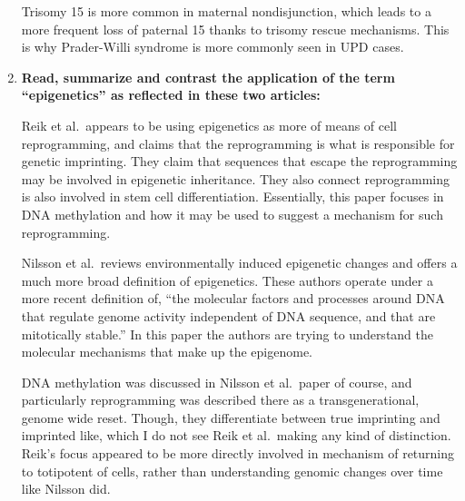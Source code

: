 \documentclass[plain,basic]{inVerba-notes}
\begin{document}
\begin{enumerate}
    Trisomy 15 is more common in maternal nondisjunction, which leads to a more frequent loss of paternal 15 thanks to trisomy rescue mechanisms. This is why Prader-Willi syndrome is more commonly seen in UPD cases. 
    
    \item \textbf{Read, summarize and contrast the application of the term “epigenetics” as reflected in these two articles:}
    

    Reik et al.\ appears to be using epigenetics as more of means of cell reprogramming, and claims that the reprogramming is what is responsible for genetic imprinting. They claim that sequences that escape the reprogramming may be involved in epigenetic inheritance. They also connect reprogramming is also involved in stem cell differentiation. Essentially, this paper focuses in DNA methylation and how it may be used to suggest a mechanism for such reprogramming. 

    Nilsson et al.\ reviews environmentally induced epigenetic changes and offers a much more broad definition of epigenetics. These authors operate under a more recent definition of, ``the molecular factors and processes around DNA that regulate genome activity independent of DNA sequence, and that are mitotically stable.'' In this paper the authors are trying to understand the molecular mechanisms that make up the epigenome.

    DNA methylation was discussed in Nilsson et al.\ paper of course, and particularly reprogramming was described there as a transgenerational, genome wide reset. Though, they differentiate between true imprinting and imprinted like, which I do not see Reik et al.\ making any kind of distinction. Reik's focus appeared to be more directly involved in mechanism of returning to totipotent of cells, rather than understanding genomic changes over time like Nilsson did. 




  \end{enumerate}
\end{document}
